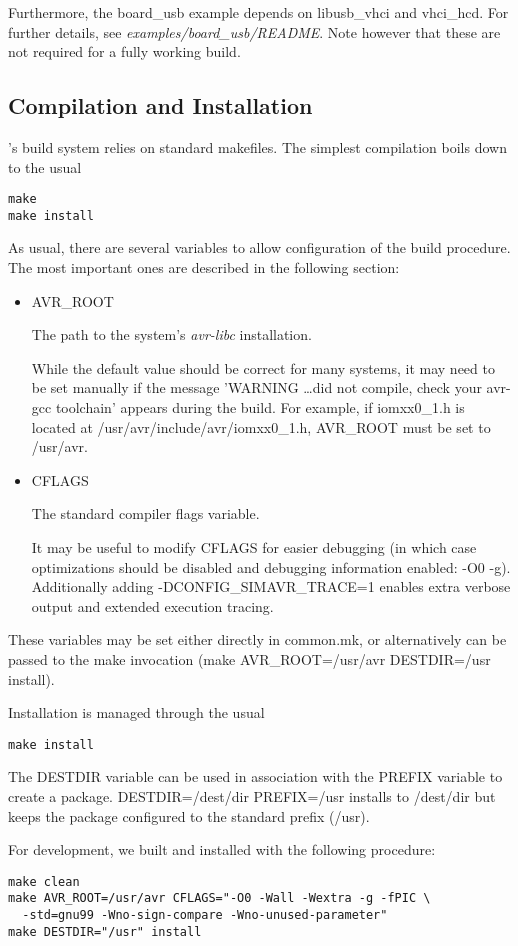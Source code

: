 Furthermore, the board\_usb example depends on libusb\_vhci and vhci\_hcd. For
further details, see \emph{examples/board\_usb/README}. Note however that these
are not required for a fully working \simavr build.

\subsection{Compilation and Installation}

\simavr's build system relies on standard makefiles. The simplest compilation
boils down to the usual

\begin{verbatim}
make
make install
\end{verbatim}

As usual, there are several variables to allow configuration of the build
procedure. The most important ones are described in the following section:

\begin{itemize}
\item AVR\_ROOT

The path to the system's \emph{avr-libc} installation.

While the default value
should be correct for many systems, it may need to be set manually if the
message 'WARNING \ldots did not compile, check your avr-gcc
toolchain' appears during the build. For example, if iomxx0\_1.h is located at
/usr/avr/include/avr/iomxx0\_1.h, AVR\_ROOT must be set to /usr/avr.

\item CFLAGS

The standard compiler flags variable.

It may be useful to modify CFLAGS for easier debugging (in which case
optimizations should be disabled and debugging information enabled: -O0 -g).
Additionally adding -DCONFIG\_SIMAVR\_TRACE=1 enables extra verbose output and
extended execution tracing.
\end{itemize}

These variables may be set either directly in common.mk, or alternatively
can be passed to the make invocation (make AVR\_ROOT=/usr/avr DESTDIR=/usr
install).

Installation is managed through the usual
\begin{verbatim}
make install
\end{verbatim}

The DESTDIR variable can be used in association with the PREFIX variable to create a \simavr package. DESTDIR=/dest/dir
PREFIX=/usr installs to /dest/dir but keeps the package configured to the standard prefix
(/usr).

For development, we built and installed \simavr with the following procedure:

\begin{verbatim}
make clean
make AVR_ROOT=/usr/avr CFLAGS="-O0 -Wall -Wextra -g -fPIC \
  -std=gnu99 -Wno-sign-compare -Wno-unused-parameter"
make DESTDIR="/usr" install
\end{verbatim}
